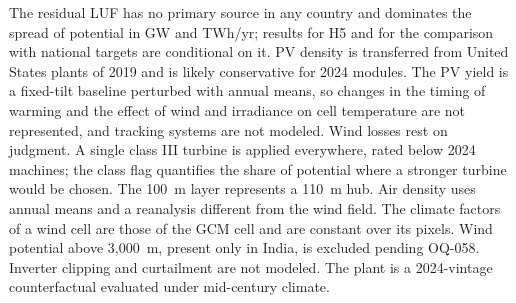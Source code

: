 The residual LUF has no primary source in any country and dominates the
spread of potential in GW and TWh/yr; results for H5 and for the
comparison with national targets are conditional on it. PV density is
transferred from United States plants of 2019 and is likely
conservative for 2024 modules. The PV yield is a fixed-tilt baseline
perturbed with annual means, so changes in the timing of warming and the
effect of wind and irradiance on cell temperature are not represented,
and tracking systems are not modeled. Wind losses rest on judgment. A
single class III turbine is applied everywhere, rated below 2024
machines; the class flag quantifies the share of potential where a
stronger turbine would be chosen. The 100~m layer represents a 110~m
hub. Air density uses annual means and a reanalysis different from the
wind field. The climate factors of a wind cell are those of the GCM
cell and are constant over its pixels. Wind potential above 3,000~m, present only in India, is excluded
pending OQ-058. Inverter clipping and curtailment are not modeled. The plant
is a 2024-vintage counterfactual evaluated under mid-century climate.
